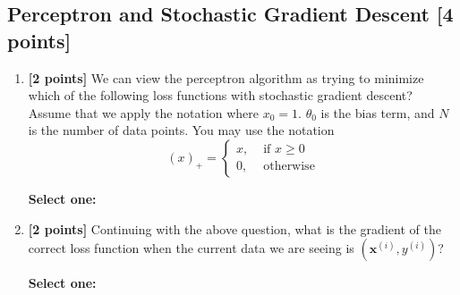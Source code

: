 \documentclass[11pt]{article}
\renewcommand{\circle}{\tikz\draw[black] (0,0) circle (1ex);}
\numberwithin{equation}{section} %
\numberwithin{figure}{section} %
\numberwithin{table}{section} %
\newcommand{\xv}{\mathbf{x}}
\begin{document}
\subsection{Perceptron and Stochastic Gradient Descent [4 points]}
\begin{enumerate}
    
    \item \textbf{[2 points]} We can view the perceptron algorithm as trying to minimize which of the following loss functions with stochastic gradient descent? Assume that we apply the notation where $x_0 = 1$. $\theta_0$ is the bias term, and $N$ is the number of data points. You may use the notation
    $$
    (x)_+ =
    \begin{cases}
    x, & \textrm{ if } x \geq 0 \\
    0, & \textrm{ otherwise}
    \end{cases}
    $$

    \textbf{Select one:}


    \item \textbf{[2 points]} Continuing with the above question, what is the gradient of the correct loss function when the current data we are seeing is $\left(\xv^{(i)}, y^{(i)}\right)$?

    \textbf{Select one:}

    
\end{enumerate}
\clearpage
\end{document}
